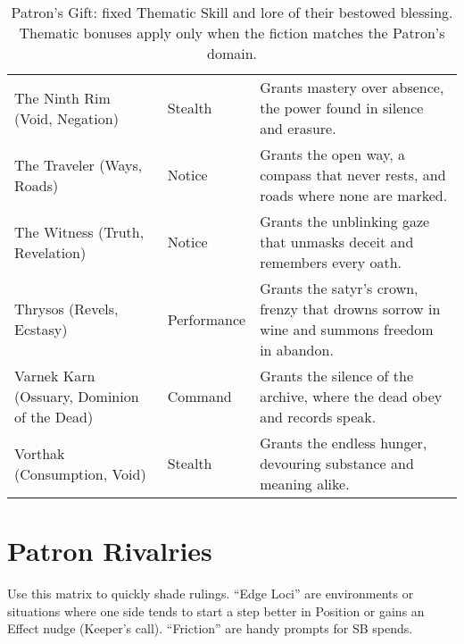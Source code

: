 \begin{table}[H]
\begin{tabular}{@{}p{3.8cm}p{3.8cm}p{7.5cm}@{}}
  The Ninth Rim (Void, Negation) & Stealth & Grants mastery over absence, the power found in silence and erasure. \\
  The Traveler (Ways, Roads) & Notice & Grants the open way, a compass that never rests, and roads where none are marked. \\
  The Witness (Truth, Revelation) & Notice & Grants the unblinking gaze that unmasks deceit and remembers every oath. \\
  Thrysos (Revels, Ecstasy) & Performance & Grants the satyr’s crown, frenzy that drowns sorrow in wine and summons freedom in abandon. \\
  Varnek Karn (Ossuary, Dominion of the Dead) & Command & Grants the silence of the archive, where the dead obey and records speak. \\
  Vorthak (Consumption, Void) & Stealth & Grants the endless hunger, devouring substance and meaning alike. \\
  \bottomrule
  \end{tabular}
  \caption{Patron's Gift: fixed Thematic Skill and lore of their bestowed blessing. Thematic bonuses apply only when the fiction matches the Patron's domain.}
  \label{tab:gift-thematic-map}
\end{table}
  


\section*{Patron Rivalries}
\label{app:patron-rivalries}

Use this matrix to quickly shade rulings. “Edge Loci” are environments or situations where one side tends to start a step better in Position or gains an Effect nudge (Keeper’s call). “Friction” are handy prompts for SB spends.

\renewcommand{\arraystretch}{1.15}
\setlength{\LTpre}{0pt}
\setlength{\LTpost}{0pt}

